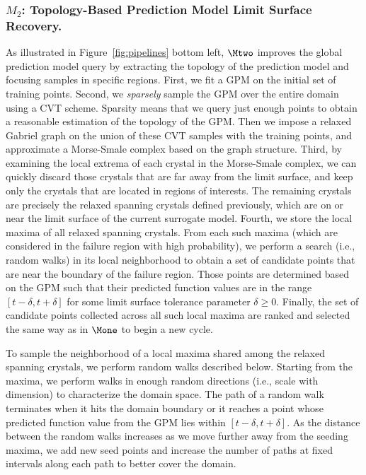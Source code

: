 \subsubsection{$M_2$: Topology-Based Prediction Model Limit Surface Recovery.}
As illustrated in Figure~\ref{fig:pipelines} bottom left, $\Mtwo$ improves the global prediction model query by extracting the topology of the prediction model and focusing samples in specific regions.
%
First, we fit a GPM on the initial set of training points.
%
Second, we \emph{sparsely} sample the GPM over the entire domain using a CVT scheme.
%
Sparsity means that we query just enough points to obtain a reasonable estimation of the topology of the GPM.
%
Then we impose a relaxed Gabriel graph on the union of these CVT samples with the training points, and approximate a Morse-Smale complex based on the graph structure.
%
Third, by examining the local extrema of each crystal in the Morse-Smale complex, we can quickly discard those crystals that are far away from the limit surface, and keep only the crystals that are located in regions of interests.
%
The remaining crystals are precisely the relaxed spanning crystals defined previously, which are on or near the limit surface of the current surrogate model.
%
Fourth, we store the local maxima of all relaxed spanning crystals.
%
From each such maxima (which are considered in the failure region with high probability), we perform a search (i.e., random walks) in its local neighborhood to obtain a set of candidate points that are near the boundary of the failure region.
%
Those points are determined based on the GPM such that their predicted function values are in the range $[t-\delta, t+\delta]$ for some limit surface tolerance parameter $\delta \geq 0$.
%
Finally, the set of candidate points collected across all such local maxima are ranked and selected the same way as in $\Mone$ to begin a new cycle.

To sample the neighborhood of a local maxima shared among the relaxed spanning crystals, we perform random walks described below.
%
Starting from the maxima, we perform walks in enough random directions (i.e., scale with dimension) to characterize the domain space.
%
The path of a random walk terminates when it hits the domain boundary or it reaches a point whose predicted function value from the GPM lies within $[t-\delta, t+\delta]$.
%
As the distance between the random walks increases as we move further away from the seeding maxima, we add new seed points and increase the number of paths at fixed intervals along each path to better cover the domain.

